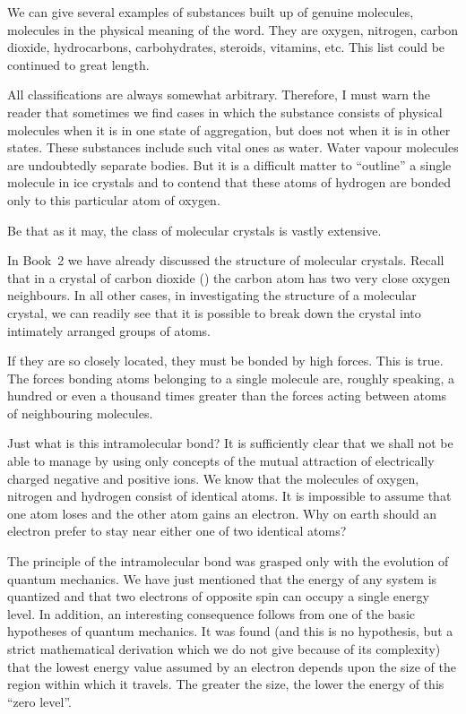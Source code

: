We can give several examples of substances built up of genuine molecules, molecules in the physical meaning of the word. They are oxygen, nitrogen, carbon dioxide, hydrocarbons, carbohydrates, steroids, vitamins, etc. This list could be continued to great length.

All classifications are always somewhat arbitrary. Therefore, I must warn the reader that sometimes we find cases in which the substance consists of physical molecules when it is in one state of aggregation, but does not when it is in other states. These substances include such vital ones as water. Water vapour molecules are undoubtedly separate bodies. But it is a difficult matter to ``outline'' a single molecule in ice crystals and to contend that these atoms of hydrogen are bonded only to this particular atom of oxygen.


Be that as it may, the class of molecular crystals is vastly extensive.

In Book~2 we have already discussed the structure of molecular crystals. Recall that in a crystal of carbon dioxide () the carbon atom has two very close oxygen neighbours. In all other cases, in investigating the structure of a molecular crystal, we can readily see that it is possible to break down the crystal into intimately arranged groups of atoms.

If they are so closely located, they must be bonded by high forces. This is true. The forces bonding atoms belonging to a single molecule are, roughly speaking, a hundred or even a thousand times greater than the forces acting between atoms of neighbouring molecules.

Just what is this intramolecular bond? It is sufficiently clear that we shall not be able to manage by using only concepts of the mutual attraction of electrically charged negative and positive ions. We know that the molecules of oxygen, nitrogen and hydrogen consist of identical atoms. It is impossible to assume that one atom loses and the other atom gains an electron. Why on earth should an electron prefer to stay near either one of two identical atoms?

The principle of the intramolecular bond was grasped only with the evolution of quantum mechanics. We have just mentioned that the energy of any system is quantized and that two electrons of opposite spin can occupy a single energy level. In addition, an interesting consequence follows from one of the basic hypotheses of quantum mechanics. It was found (and this is no hypothesis, but a strict mathematical derivation which we do not give because of its complexity) that the lowest energy value assumed by an electron depends upon the size of the region within which it travels. The greater the size, the lower the energy of this ``zero level''.

